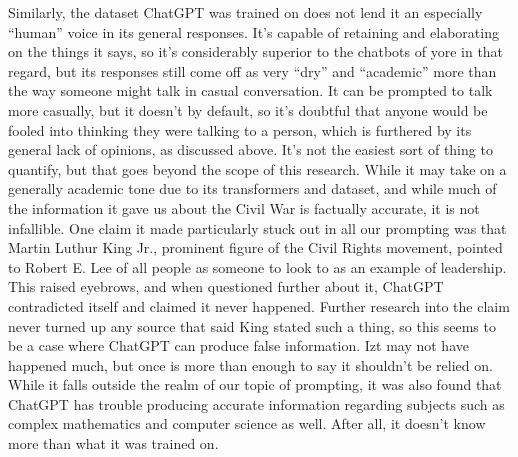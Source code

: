 \documentclass[letterpaper, 10 pt, conference]{ieeeconf}  %
\begin{document}
	Similarly, the dataset ChatGPT was trained on does not lend it an especially “human” voice in its general responses. It’s capable of retaining and elaborating on the things it says, so it’s considerably superior to the chatbots of yore in that regard, but its responses still come off as very “dry” and “academic” more than the way someone might talk in casual conversation. It can be prompted to talk more casually, but it doesn’t by default, so it’s doubtful that anyone would be fooled into thinking they were talking to a person, which is furthered by its general lack of opinions, as discussed above. It’s not the easiest sort of thing to quantify, but that goes beyond the scope of this research.
	While it may take on a generally academic tone due to its transformers and dataset, and while much of the information it gave us about the Civil War is factually accurate, it is not infallible. One claim it made particularly stuck out in all our prompting was that Martin Luthur King Jr., prominent figure of the Civil Rights movement, pointed to Robert E. Lee of all people as someone to look to as an example of leadership. This raised eyebrows, and when questioned further about it, ChatGPT contradicted itself and claimed it never happened. Further research into the claim never turned up any source that said King stated such a thing, so this seems to be a case where ChatGPT can produce false information. Izt may not have happened much, but once is more than enough to say it shouldn’t be relied on. While it falls outside the realm of our topic of prompting, it was also found that ChatGPT has trouble producing accurate information regarding subjects such as complex mathematics and computer science as well. After all, it doesn’t know more than what it was trained on.

\addtolength{\textheight}{-12cm}   %




\end{document}
